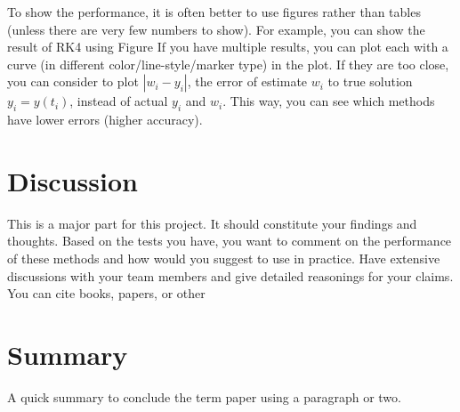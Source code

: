 \documentclass[11pt]{article}	%
\begin{document}
To show the performance, it is often better to use figures
rather than tables (unless there are very few numbers to show).
For example, you can show the result of RK4
using Figure If you have multiple results, you can plot each
with a curve (in different color/line-style/marker type) in the plot. If they are too close, you can consider to
plot $|w_i-y_i|$, the error of estimate $w_i$ to true solution $y_i=y(t_i)$,
instead of actual $y_i$ and $w_i$. This way, you can see which methods have lower errors (higher accuracy).

\section{Discussion}
This is a major part for this project. It should constitute your findings and thoughts.
Based on the tests you have,
you want to comment on the performance of these methods and how would you
suggest to use in practice. Have extensive discussions with your team members
and give detailed reasonings for your claims. You can cite books, papers, or other


\section{Summary}
A quick summary to conclude the term paper using a paragraph or two.
\end{document}
